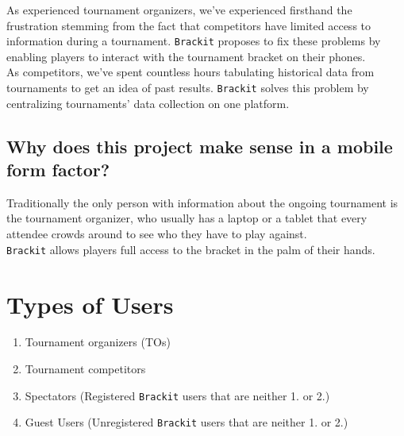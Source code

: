 \documentclass{article}
\begin{document}
As experienced tournament organizers, we've experienced firsthand the frustration stemming from the fact that competitors have limited access to information during a tournament. \texttt{Brackit} proposes to fix these problems by enabling players to interact with the tournament bracket on their phones. \\As competitors, we've spent countless hours tabulating historical data from tournaments to get an idea of past results. \texttt{Brackit} solves this problem by centralizing tournaments' data collection on one platform. 

\subsection*{Why does this project make sense in a mobile form factor?}
Traditionally the only person with information about the ongoing tournament is the tournament organizer, who usually has a laptop or a tablet that every attendee crowds around to see who they have to play against. \\\texttt{Brackit} allows players full access to the bracket in the palm of their hands.



\section*{Types of Users}
\begin{enumerate}
    \item{Tournament organizers (TOs)}
    \item{Tournament competitors}
    \item{Spectators (Registered \texttt{Brackit} users that are neither 1. or 2.)}
    \item{Guest Users (Unregistered \texttt{Brackit} users that are neither 1. or 2.)}
\end{enumerate}
\end{document}

